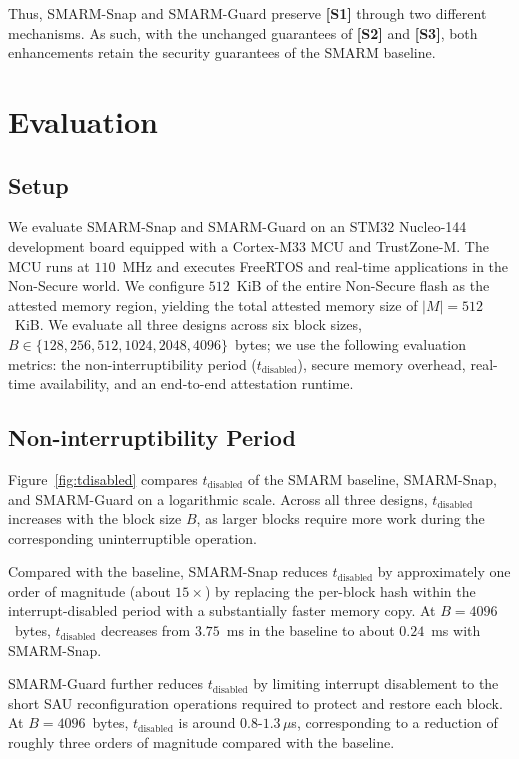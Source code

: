 \documentclass[conference]{IEEEtran}
\newcommand{\tdis}{$t_{\mathrm{disabled}}$\xspace}
\newcommand{\smarmcopy}{SMARM-Snap\xspace}
\newcommand{\smarmlock}{SMARM-Guard\xspace}
\begin{document}
Thus, \smarmcopy and \smarmlock preserve \textbf{[S1]} through two different mechanisms.
As such, with the unchanged guarantees of \textbf{[S2]} and \textbf{[S3]}, both enhancements retain the security guarantees of the SMARM baseline.



\section{Evaluation}
\label{sec:eval}

\subsection{Setup}

We evaluate \smarmcopy and \smarmlock on an STM32 Nucleo-144 development board equipped with a Cortex-M33 MCU and TrustZone-M. The MCU runs at $110$~MHz and executes FreeRTOS and real-time applications in the Non-Secure world. 
We configure $512$~KiB of the entire Non-Secure flash as the attested memory region, yielding the total attested memory size of $|M|{=}512$~KiB.
We evaluate all three designs across six block sizes,
$B\in\{128,256,512,1024,2048,4096\}$~bytes; we use the following evaluation metrics: the non-interruptibility period (\tdis), secure memory overhead, real-time availability, and an end-to-end attestation runtime.

\subsection{Non-interruptibility Period}

Figure~\ref{fig:tdisabled} compares \tdis{} of the SMARM baseline, \smarmcopy, and \smarmlock{} on a logarithmic scale. Across all three designs, \tdis{} increases with the block size $B$, as larger blocks require more work during the corresponding uninterruptible operation.

Compared with the baseline, \smarmcopy{} reduces \tdis{} by approximately one order of magnitude (about $15\times$) by replacing the per-block hash within the interrupt-disabled period with a substantially faster memory copy. At $B{=}4096$~bytes, \tdis{} decreases from $3.75$~ms in the baseline to about $0.24$~ms with \smarmcopy.


\smarmlock{} further reduces \tdis{} by limiting interrupt disablement to the short SAU reconfiguration operations required to protect and restore each block. At $B{=}4096$~bytes, \tdis{} is around $0.8$-$1.3\,\mu$s, corresponding to a reduction of roughly three orders of magnitude compared with the baseline.
\end{document}
